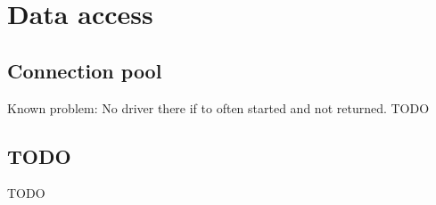 \section{Data access}


\subsection{Connection pool}
Known problem: No driver there if to often started and not returned. TODO 

\subsection{TODO}
TODO